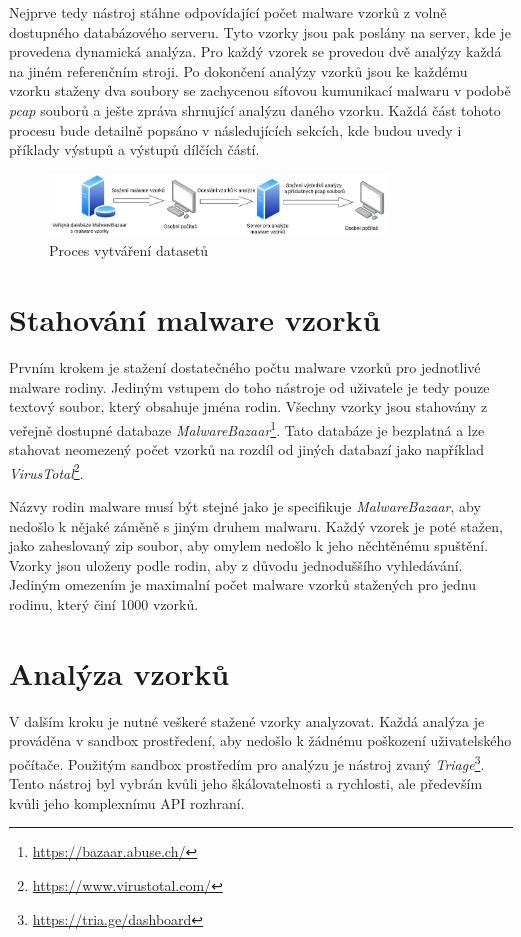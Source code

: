 Nejprve tedy nástroj stáhne odpovídající počet malware vzorků z volně dostupného databázového serveru. Tyto vzorky jsou pak poslány na server, kde je provedena dynamická analýza.
Pro každý vzorek se provedou dvě analýzy každá na jiném referenčním stroji.
Po dokončení analýzy vzorků jsou ke každému vzorku staženy dva soubory se zachycenou síťovou kumunikací malwaru v podobě \textit{pcap} souborů a ješte zpráva shrnující analýzu daného vzorku.
Každá část tohoto procesu bude detailně popsáno v následujících sekcích, kde budou uvedy i příklady výstupů a výstupů dílčích částí.\\

\begin{figure}[h]
	\centering
        \includegraphics[width=0.8\textwidth]{obrazky/pipeline.png}
	\caption{Proces vytváření datasetů}
    \label{pipeline}
\end{figure}

\section{Stahování malware vzorků}
Prvním krokem je stažení dostatečného počtu malware vzorků pro jednotlivé malware rodiny. Jediným vstupem do toho nástroje od uživatele je tedy pouze textový soubor, který obsahuje
jména rodin. Všechny vzorky jsou stahovány z veřejně dostupné databaze \textit{MalwareBazaar}\footnote{\href{https://bazaar.abuse.ch/}{https://bazaar.abuse.ch/}}. Tato databáze je 
bezplatná a lze stahovat neomezený počet vzorků na rozdíl od jiných databazí jako například \textit{VirusTotal}\footnote{\href{https://www.virustotal.com/gui/home/upload}{https://www.virustotal.com/}}.

Názvy rodin malware musí být stejné jako je specifikuje \textit{MalwareBazaar}, aby nedošlo k nějaké záměně s jiným druhem malwaru. Každý vzorek je poté stažen, jako zaheslovaný zip soubor, aby omylem nedošlo k 
jeho něchtěnému spuštění. Vzorky jsou uloženy podle rodin, aby z důvodu jednoduššího vyhledávání. Jediným omezením je maximalní počet malware vzorků stažených pro jednu rodinu, který činí 1000 vzorků.

\section{Analýza vzorků}
V dalším kroku je nutné veškeré stažené vzorky analyzovat. Každá analýza je prováděna v sandbox prostředení, aby nedošlo k žádnému poškození uživatelského počítače.
Použitým sandbox prostředím pro analýzu je nástroj zvaný \textit{Triage}\footnote{\href{https://tria.ge/dashboard}{https://tria.ge/dashboard}}. Tento nástroj byl vybrán kvůli jeho škálovatelnosti a rychlosti, 
ale především kvůli jeho komplexnímu API rozhraní.

